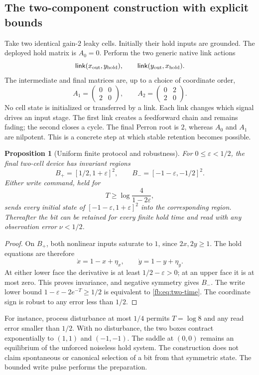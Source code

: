 \documentclass[11pt]{article}
\newtheorem{proposition}[theorem]{Proposition}
\theoremstyle{definition}
\theoremstyle{remark}
\begin{document}
\subsection{The two-component construction with explicit bounds}
Take two identical gain-$2$ leaky cells. Initially their hold inputs are grounded. The deployed hold matrix is $A_0=0$. Perform the two generic native link actions
\[
 \mathsf{link}(x_{\rm out},y_{\rm hold}),\qquad
 \mathsf{link}(y_{\rm out},x_{\rm hold}).
\]
The intermediate and final matrices are, up to a choice of coordinate order,
\[
 A_1=\begin{pmatrix}0&0\\2&0\end{pmatrix},\qquad
 A_2=\begin{pmatrix}0&2\\2&0\end{pmatrix}.
\]
No cell state is initialized or transferred by a link. Each link changes which signal drives an input stage. The first link creates a feedforward chain and remains fading; the second closes a cycle. The final Perron root is $2$, whereas $A_0$ and $A_1$ are nilpotent. This is a concrete step at which stable retention becomes possible.

\begin{proposition}[Uniform finite protocol and robustness]\label{fb:prop:two}
For $0\leq\varepsilon<1/2$, the final two-cell device has invariant regions
\[
 B_+=[1/2,1+\varepsilon]^2,
 \qquad B_-=[-1-\varepsilon,-1/2]^2.
\]
Either write command, held for
\begin{equation}\label{fb:eq:two-time}
 T\geq\log\frac{4}{1-2\varepsilon},
\end{equation}
sends every initial state of $[-1-\varepsilon,1+\varepsilon]^2$ into the corresponding region. Thereafter the bit can be retained for every finite hold time and read with any observation error $\nu<1/2$.
\end{proposition}
\begin{proof}
On $B_+$, both nonlinear inputs saturate to $1$, since $2x,2y\geq1$. The hold equations are therefore
\[
 \dot x=1-x+\eta_x,\qquad
 \dot y=1-y+\eta_y.
\]
At either lower face the derivative is at least $1/2-\varepsilon>0$; at an upper face it is at most zero. This proves invariance, and negative symmetry gives $B_-$. The write lower bound $1-\varepsilon-2e^{-T}\geq1/2$ is equivalent to \eqref{fb:eq:two-time}. The coordinate sign is robust to any error less than $1/2$.
\end{proof}
For instance, process disturbance at most $1/4$ permits $T=\log8$ and any read error smaller than $1/2$. With no disturbance, the two boxes contract exponentially to $(1,1)$ and $(-1,-1)$. The saddle at $(0,0)$ remains an equilibrium of the unforced noiseless hold system. The construction does not claim spontaneous or canonical selection of a bit from that symmetric state. The bounded write pulse performs the preparation.
\end{document}
